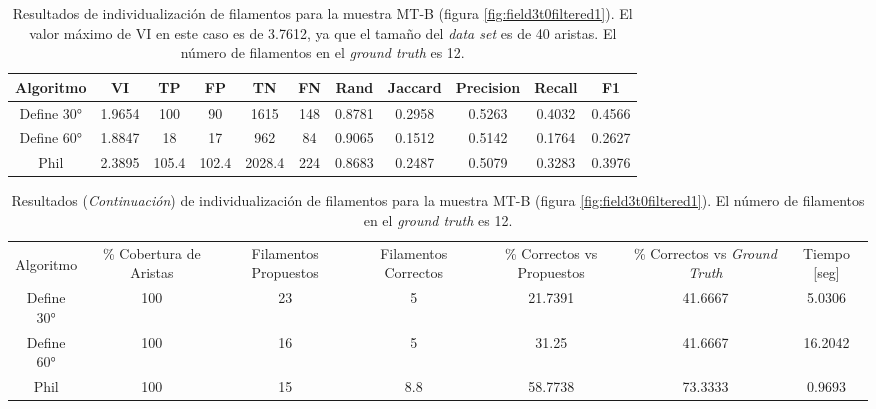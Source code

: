 \begin{table}[h]
    \centering
    \begin{tabular}{|c|c|c|c|c|c|c|c|c|c|c|}
    \hline
        Algoritmo & VI & TP & FP &TN &FN & Rand	& Jaccard &	Precision &	Recall &	F1 \\ \hline
        Define 30° & 1.9654 & 100 & 90 & 1615 & 148 & 0.8781 & 0.2958 & 0.5263 & 0.4032 & 0.4566\\
        Define 60° & 1.8847 & 18 & 17 & 962 & 84 & 0.9065 & 0.1512 & 0.5142 & 0.1764 & 0.2627\\ 
        Phil & 2.3895 & 105.4 & 102.4 & 2028.4 & 224 & 0.8683 & 0.2487 & 0.5079 & 0.3283 & 0.3976 \\
        \hline
    \end{tabular}
    \caption{Resultados de individualizaci\'on de filamentos para la muestra MT-B (figura \ref{fig:field3t0filtered1}). El valor m\'aximo de VI en este caso es de 3.7612, ya que el tama\~no del {\it data set} es de 40 aristas. El n\'umero de filamentos en el {\it ground truth} es 12.}
    \label{tab:field3t0filtered1}
\end{table}
\addtocounter{table}{-1}
\begin{table}[h]
    \centering
    \begin{tabular}{|c|c|c|c|c|c|c|}
    \hline
         & \multirow{4}{2cm}{\centering \% Cobertura de Aristas} & \multirow{4}{2cm}{Filamentos Propuestos} & \multirow{4}{2cm}{Filamentos Correctos} & \multirow{4}{2.5cm}{\% Correctos vs Propuestos} & \multirow{4}{2.5cm}{\centering \% Correctos vs {\it Ground Truth}} & \multirow{4}{1.2cm}{\centering Tiempo [seg]} \\
         &  &  &  & & &  \\
        Algoritmo &  &  &  & & &  \\
        &  &  &  & & &  \\ \hline
        Define 30° & 100 & 23 & 5 & 21.7391 & 41.6667 & 5.0306 \\
        Define 60° & 100 & 16 & 5 & 31.25 & 41.6667 & 16.2042 \\ 
        Phil & 100 & 15 & 8.8 & 58.7738 & 73.3333 & 0.9693 \\
        \hline
    \end{tabular}
    \caption{Resultados ({\it Continuaci\'on}) de individualizaci\'on de filamentos para la muestra MT-B (figura \ref{fig:field3t0filtered1}). El n\'umero de filamentos en el {\it ground truth} es 12.}
\end{table}


